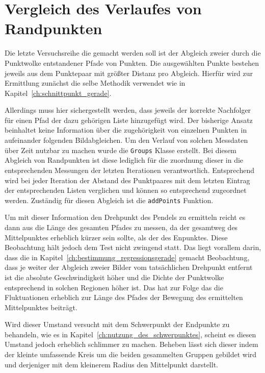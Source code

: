 \section{Vergleich des Verlaufes von Randpunkten}\label{ch:vergleich_verlauf_randpunkte}

Die letzte Versuchsreihe die gemacht werden soll ist der Abgleich zweier durch die Punktwolke entstandener Pfade von Punkten.
Die ausgewählten Punkte bestehen jeweils aus dem Punktepaar mit größter Distanz pro Abgleich.
Hierfür wird zur Ermittlung zunächst die selbe Methodik verwendet wie in Kapitel~\ref{ch:schnittpunkt_gerade}.

Allerdings muss hier sichergestellt werden, dass jeweils der korrekte Nachfolger für einen Pfad der dazu gehörigen Liste hinzugefügt wird.
Der bisherige Ansatz beinhaltet keine Information über die zugehörigkeit von einzelnen Punkten in aufeinander folgenden Bildabgleichen.
Um den Verlauf von solchen Messdaten über Zeit nutzbar zu machen wurde die \lstinline{Groups} Klasse erstellt.
Bei diesem Abgleich von Randpunkten ist diese lediglich für die zuordnung dieser in die entsprechenden Messungen der letzten Iterationen verantwortlich.
Entsprechend wird bei jeder Iteration der Abstand des Punktpaares mit dem letzten Eintrag der entsprechenden Listen verglichen und können so entsprechend zugeordnet werden.
Zuständig für diesen Abgleich ist die \lstinline{addPoints} Funktion.

Um mit dieser Information den Drehpunkt des Pendels zu ermitteln reicht es dann aus die Länge des gesamten Pfades zu messen, da der gesamtweg des Mittelpunktes erheblich kürzer sein sollte, als der des Enpunktes.
Diese Beobachtung hält jedoch dem Test nicht zwingend statt.
Das liegt vorallem darin, dass die in Kapitel~\ref{ch:bestimmung_regressionsgerade} gemacht Beobachtung, dass je weiter der Abgleich zweier Bilder vom tatsächlichen Drehpunkt entfernt ist die absolute Geschwindigkeit höher und die Dichte der Punktwolke entsprechend in solchen Regionen höher ist.
Das hat zur Folge das die Fluktuationen erheblich zur Länge des Pfades der Bewegung des ermittelten Mittelpunktes beiträgt.

Wird dieser Umstand versucht mit dem Schwerpunkt der Endpunkte zu behandeln, wie es in Kapitel~\ref{ch:nutzung_des_schwerpunktes}, scheint es diesen Umstand jedoch erheblich schlimmer zu machen.
Beheben lässt sich dieser indem der kleinte umfassende Kreis um die beiden gesammelten Gruppen gebildet wird und derjeniger mit dem kleinerem Radius den Mittelpunkt darstellt.

